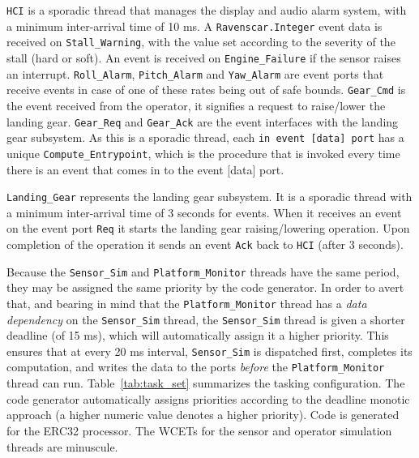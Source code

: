 \texttt{HCI} is a sporadic thread that manages the display and audio
alarm system, with a minimum inter-arrival time of 10 ms. A
\texttt{Ravenscar.Integer} event data is received on
\texttt{Stall\_Warning}, with the value set according to the severity
of the stall (hard or soft). An event is received on
\texttt{Engine\_Failure} if the sensor raises an
interrupt. \texttt{Roll\_Alarm}, \texttt{Pitch\_Alarm} and
\texttt{Yaw\_Alarm} are event ports that receive events in case of one
of these rates being out of safe bounds. \texttt{Gear\_Cmd} is the
event received from the operator, it signifies a request to
raise/lower the landing gear. \texttt{Gear\_Req} and
\texttt{Gear\_Ack} are the event interfaces with the landing gear
subsystem. As this is a sporadic thread, each \texttt{in event [data]
  port} has a unique \texttt{Compute\_Entrypoint}, which is the
procedure that is invoked every time there is an event that comes in
to the event [data] port.

\texttt{Landing\_Gear} represents the landing gear subsystem. It is a
sporadic thread with a minimum inter-arrival time of 3 seconds for
events. When it receives an event on the event port \texttt{Req} it
starts the landing gear raising/lowering operation. Upon completion of
the operation it sends an event \texttt{Ack} back to \texttt{HCI}
(after 3 seconds).

Because the \texttt{Sensor\_Sim} and \texttt{Platform\_Monitor}
threads have the same period, they may be assigned the same priority
by the code generator. In order to avert that, and bearing in mind
that the \texttt{Platform\_Monitor} thread has a \emph{data
  dependency} on the \texttt{Sensor\_Sim} thread, the
\texttt{Sensor\_Sim} thread is given a shorter deadline (of 15 ms),
which will automatically assign it a higher priority. This ensures
that at every 20 ms interval, \texttt{Sensor\_Sim} is dispatched
first, completes its computation, and writes the data to the ports
\emph{before} the \texttt{Platform\_Monitor} thread can
run. Table~\ref{tab:task_set} summarizes the tasking
configuration. The code generator automatically assigns priorities
according to the deadline monotic approach (a higher numeric value
denotes a higher priority). Code is generated for the ERC32
processor. The WCETs for the sensor and operator simulation threads
are minuscule.

